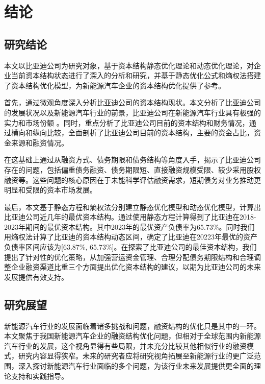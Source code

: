 \chapter{结论}
\section{研究结论}




本文以比亚迪公司为研究对象，基于资本结构静态优化理论和动态优化理论，对企业当前资本结构状态进行了深入的分析和研究，并基于静态优化公式和熵权法搭建了资本结构优化模型，为新能源汽车企业的资本结构优化提供了参考。

首先，通过微观角度深入分析比亚迪公司的资本结构现状。本文分析了比亚迪公司的发展状况以及新能源汽车行业的前景，比亚迪公司在新能源汽车行业具有极强的实力和市场份额 。同时，重点分析了比亚迪公司目前的资本结构和财务情况，通过横向和纵向比较，全面剖析了比亚迪公司目前的资本结构，主要的资金占比，资金来源和融资情况。

在这基础上通过从融资方式、债务期限和债务结构等角度入手，揭示了比亚迪公司存在的问题，包括偏重债务融资、债务期限短、直接融资规模受限、较少采用股权融资等。这些问题的核心原因在于未能科学评估融资需求，短期债务对业务推动更明显和受限的资本市场发展。

最后，本文基于静态方程和熵权法分别建立静态优化模型和动态优化模型，计算出比亚迪公司近几年的最优资本结构。通过使用静态方程计算得到了比亚迪在2018-2023年期间的最优资本结构。其中2023年的最优资产负债率为65.73\%。同时我们用熵权法计算了比亚迪的资本结构动态区间，确定了比亚迪在20223年最优的资产负债率区间应该为[63.87\%, 65.73\%]。在探索了比亚迪公司的最佳资本结构，我们提出了针对性的优化策略，从加强营运资金管理、合理分配债务期限结构和合理调整企业融资渠道比重三个方面提出优化资本结构的建议，以期为比亚迪公司的未来发展提供有效支持。
\section{研究展望}
新能源汽车行业的发展面临着诸多挑战和问题，融资结构的优化只是其中的一环。本文聚焦于我国新能源汽车企业的融资结构优化问题，但相对于全球范围内新能源汽车行业的发展，这个视角显得有些局限，并未充分比较其他相似行业的融资模式，研究内容显得狭窄。未来的研究者应将研究视角拓展至新能源行业的更广泛范围，深入探讨新能源汽车行业面临的多个问题，为该行业未来发展提供更全面的理论支持和实践指导。